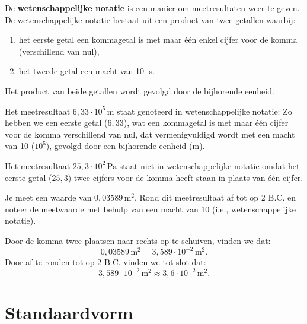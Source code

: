 \documentclass{ximera}
\begin{document}
\begin{definition}\nl
    De \textbf{wetenschappelijke notatie} is een manier om meetresultaten weer te geven. De wetenschappelijke notatie bestaat uit een product van twee getallen waarbij:
    \begin{enumerate}
    \item het eerste getal een kommagetal is met maar één enkel cijfer voor de komma (verschillend van nul),
    \item het tweede getal een macht van 10 is.
    \end{enumerate}
    Het product van beide getallen wordt gevolgd door de bijhorende eenheid.
\end{definition}

\begin{example}[title={Wetenschappelijke Notatie}]\nl
    Het meetresultaat $6{,}33 \cdot 10^{5} \, \mathrm{m}$ staat genoteerd in wetenschappelijke notatie: Zo hebben we een eerste getal ($6{,}33$), wat een kommagetal is met maar één cijfer voor de komma verschillend van nul, dat vermenigvuldigd wordt met een macht van 10 ($10^{5}$), gevolgd door een bijhorende eenheid ($\mathrm{m}$).
\end{example}

\begin{example}[title={Niet Wetenschappelijke Notatie}]\nl
    Het meetresultaat $25{,}3 \cdot 10^{2} \, \mathrm{Pa}$ staat niet in wetenschappelijke notatie omdat het eerste getal ($25{,}3$) twee cijfers voor de komma heeft staan in plaats van één cijfer.
\end{example}

\begin{example}[foldable=true,title={Voorbeeld: Groot getal afronden op aantal B.C.}]\nl
    Je meet een waarde van $0{,}03589 \, \mathrm{m}^{2}$. Rond dit meetresultaat af tot op 2 B.C. en noteer de meetwaarde met behulp van een macht van 10 (i.e., wetenschappelijke notatie). 

    \begin{solution}\nl
    Door de komma twee plaatsen naar rechts op te schuiven, vinden we dat:
    \[0{,}03589 \, \mathrm{m}^{2} = 3{,}589 \cdot 10^{-2} \, \mathrm{m}^{2}.\] 
    Door af te ronden tot op 2 B.C. vinden we tot slot dat:
    \[3{,}589 \cdot 10^{-2} \, \mathrm{m}^{2} \approx 3{,}6 \cdot 10^{-2} \, \mathrm{m}^{2}.\]
    \end{solution}
\end{example}

\section{Standaardvorm}
\end{document}
